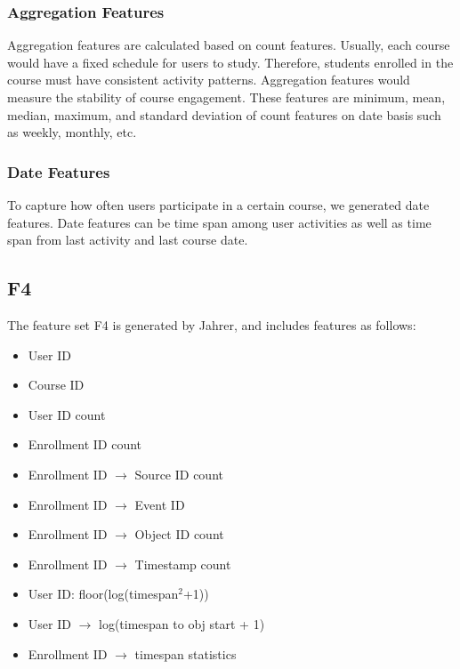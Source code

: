 \subsubsection{Aggregation Features}
Aggregation features are calculated based on count features. Usually, each course would have a fixed schedule for users to study. Therefore, students enrolled in the course must have consistent activity patterns.  Aggregation features would measure the stability of course engagement.  These features are minimum, mean, median, maximum, and standard deviation of count features on date basis such as weekly, monthly, etc.

\subsubsection{Date Features}
To capture how often users participate in a certain course, we generated date features. Date features can be time span among user activities as well as time span from last activity and last course date. 

\subsection{F4}
The feature set F4 is generated by Jahrer, and includes features as follows:

\begin{itemize}
  \setlength\itemsep{0em}
  \item User ID 
  \item Course ID
  \item User ID count 
  \item Enrollment ID count 
  \item Enrollment ID $\rightarrow$ Source ID count 
  \item Enrollment ID $\rightarrow$ Event ID 
  \item Enrollment ID $\rightarrow$ Object ID count 
  \item Enrollment ID $\rightarrow$ Timestamp count
  \item User ID: floor(log(timespan$^2$+1))
  \item User ID $\rightarrow$ log(timespan to obj start + 1) 
  \item Enrollment ID $\rightarrow$ timespan statistics 
\end{itemize}

